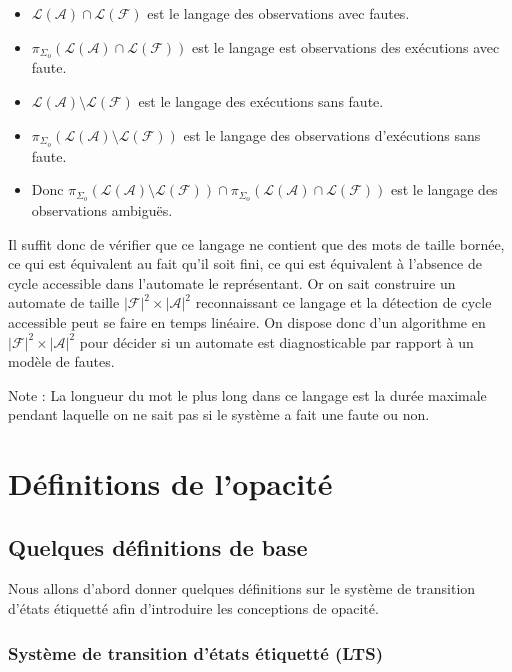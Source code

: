 \documentclass[10pt,a4paper]{article}
\begin{document}
\begin{itemize}
  \item $\mathcal L (\mathcal A) \cap \mathcal L(\mathcal F)$ est le langage des observations avec fautes.
  \item $\pi_{\Sigma_o}(\mathcal L (\mathcal A) \cap \mathcal L(\mathcal F))$ est le langage est observations des ex\'ecutions avec faute.
  \item $\mathcal L(\mathcal A) \setminus \mathcal L(\mathcal F)$ est le langage des ex\'ecutions sans faute.
  \item $\pi_{\Sigma_o}(\mathcal L(\mathcal A) \setminus \mathcal L(\mathcal F))$ est le langage des observations d'ex\'ecutions sans faute.
  \item Donc $\pi_{\Sigma_o}(\mathcal L(\mathcal A) \setminus \mathcal L(\mathcal F)) \cap \pi_{\Sigma_o}(\mathcal L (\mathcal A) \cap \mathcal L(\mathcal F))$ est le langage des observations ambiguës.
\end{itemize}
Il suffit donc de v\'erifier que ce langage ne contient que des mots de taille born\'ee, ce qui est équivalent au fait qu'il soit fini, ce qui est \'equivalent \`a l'absence de cycle accessible dans l'automate le repr\'esentant. Or on sait construire un automate de taille $|\mathcal F|^2 \times |\mathcal A|^2$ reconnaissant ce langage et la d\'etection de cycle accessible peut se faire en temps lin\'eaire. On dispose donc d'un algorithme en $|\mathcal F|^2 \times |\mathcal A|^2$ pour d\'ecider si un automate est diagnosticable par rapport \`a un mod\`ele de fautes.

Note : La longueur du mot le plus long dans ce langage est la dur\'ee maximale pendant laquelle on ne sait pas si le syst\`eme a fait une faute ou non.


\section{D\'efinitions de l'opacit\'e}

\subsection{Quelques d\'efinitions de base}

Nous allons d'abord donner quelques d\'efinitions sur le syst\`eme de transition d'\'etats \'etiquett\'e afin d'introduire les conceptions de opacit\'e.

\subsubsection{Syst\`eme de transition d'\'etats \'etiquett\'e (LTS)}
\end{document}
